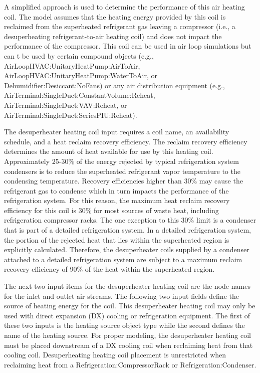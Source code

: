 A simplified approach is used to determine the performance of this air heating coil. The model assumes that the heating energy provided by this coil is reclaimed from the superheated refrigerant gas leaving a compressor (i.e., a desuperheating refrigerant-to-air heating coil) and does not impact the performance of the compressor. This coil can be used in air loop simulations but can t be used by certain compound objects (e.g., AirLoopHVAC:UnitaryHeatPump:AirToAir, AirLoopHVAC:UnitaryHeatPump:WaterToAir, or Dehumidifier:Desiccant:NoFans) or any air distribution equipment (e.g., AirTerminal:SingleDuct:ConstantVolume:Reheat, AirTerminal:SingleDuct:VAV:Reheat, or AirTerminal:SingleDuct:SeriesPIU:Reheat).

The desuperheater heating coil input requires a coil name, an availability schedule, and a heat reclaim recovery efficiency. The reclaim recovery efficiency determines the amount of heat available for use by this heating coil. Approximately 25-30\% of the energy rejected by typical refrigeration system condensers is to reduce the superheated refrigerant vapor temperature to the condensing temperature. Recovery efficiencies higher than 30\% may cause the refrigerant gas to condense which in turn impacts the performance of the refrigeration system. For this reason, the maximum heat reclaim recovery efficiency for this coil is 30\% for most sources of waste heat, including refrigeration compressor racks. The one exception to this 30\% limit is a condenser that is part of a detailed refrigeration system. In a detailed refrigeration system, the portion of the rejected heat that lies within the superheated region is explicitly calculated. Therefore, the desuperheater coils supplied by a condenser attached to a detailed refrigeration system are subject to a maximum reclaim recovery efficiency of 90\% of the heat within the superheated region.

The next two input items for the desuperheater heating coil are the node names for the inlet and outlet air streams. The following two input fields define the source of heating energy for the coil. This desuperheater heating coil may only be used with direct expansion (DX) cooling or refrigeration equipment. The first of these two inputs is the heating source object type while the second defines the name of the heating source. For proper modeling, the desuperheater heating coil must be placed downstream of a DX cooling coil when reclaiming heat from that cooling coil. Desuperheating heating coil placement is unrestricted when reclaiming heat from a Refrigeration:CompressorRack or Refrigeration:Condenser.

